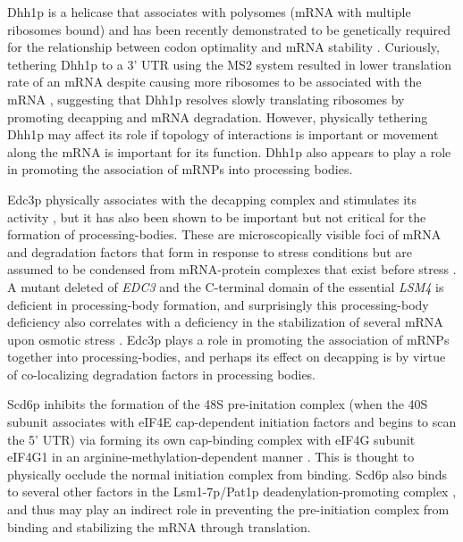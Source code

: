 Dhh1p is a helicase that associates with polysomes (mRNA
with multiple ribosomes bound) and has been recently demonstrated to
be genetically required for the relationship between codon optimality
and mRNA stability 
\parencite{sweet2012dead,radhakrishnan2016dead,presnyak2015codon}. 
Curiously, tethering Dhh1p to a 3' UTR
using the MS2 system resulted in lower translation rate of an mRNA
despite causing more ribosomes to be associated with the mRNA
\parencite{sweet2012dead}, suggesting that Dhh1p resolves slowly 
translating ribosomes by promoting decapping and mRNA degradation.  
However, physically tethering Dhh1p may affect its role if
topology of interactions is important or movement along the mRNA
is important for its function.
Dhh1p also appears to play a role in promoting the association of
mRNPs into processing bodies.

Edc3p
physically associates with the decapping complex and stimulates its
activity \parencite{nissan2010decapping}, 
but it has also been shown to be
important \parencite{decker2007edc3p,huch2016decapping} but not critical 
\parencite{rao2017numerous}
for the formation of processing-bodies. 
These are
microscopically visible foci of mRNA and degradation factors that form
in response to stress conditions but are assumed to be condensed from
mRNA-protein complexes that exist before stress 
\parencite{sheth2003decapping,lui2014granules,rao2017numerous}. 
A mutant deleted of \textit{EDC3} and the C-terminal domain of the
essential \textit{LSM4} is deficient in processing-body formation, 
and surprisingly this processing-body deficiency also correlates with a
deficiency in the stabilization of several mRNA upon osmotic stress
\parencite{huch2017mrna}. 
Edc3p plays a role in promoting the association of mRNPs
together into processing-bodies, and perhaps its effect on 
decapping is by virtue of co-localizing degradation factors in 
processing bodies.



Scd6p inhibits the formation of the 48S pre-initation complex
(when the 40S subunit associates with eIF4E cap-dependent initiation
factors and begins to scan the 5' UTR) via forming its own cap-binding
complex with eIF4G subunit eIF4G1 in an arginine-methylation-dependent
manner \parencite{rajyaguru2012scd6,poornima2016arginine}. 
This is thought
to physically occlude the normal initiation complex from binding.
Scd6p also binds to several other factors in the Lsm1-7p/Pat1p
deadenylation-promoting complex \parencite{nissan2010decapping}, 
and thus may play an indirect role in preventing the pre-initiation 
complex from binding and stabilizing the mRNA through translation.  

